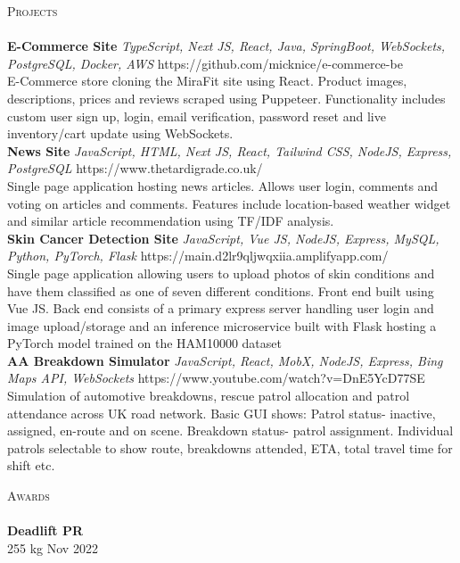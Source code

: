 \documentclass[a4paper]{article}
\newcommand{\lineunder} {
    \vspace*{-8pt} \\
    \hspace*{-18pt} \hrulefill \\
}
\newcommand{\header} [1] {
    {\hspace*{-18pt}\vspace*{6pt} \textsc{#1}}
    \vspace*{-6pt} \lineunder
}
\begin{document}
\header{Projects}
{\textbf{E-Commerce Site}} {\sl TypeScript, Next JS, React, Java, SpringBoot, WebSockets, PostgreSQL, Docker, AWS} \hfill https://github.com/micknice/e-commerce-be\\
E-Commerce store cloning the MiraFit site using React. Product images, descriptions, prices and reviews scraped using Puppeteer. Functionality includes custom user sign up, login, email verification, password reset and live inventory/cart update using WebSockets.\\
\vspace*{2mm}
{\textbf{News Site}} {\sl JavaScript, HTML, Next JS, React, Tailwind CSS, NodeJS, Express, PostgreSQL} \hfill https://www.thetardigrade.co.uk/\\
Single page application hosting news articles. Allows user login, comments and voting on articles and comments. Features include location-based weather widget and similar article recommendation using TF/IDF analysis.\\
\vspace*{2mm}
{\textbf{Skin Cancer Detection Site}} {\sl JavaScript, Vue JS, NodeJS, Express, MySQL, Python, PyTorch, Flask} \hfill https://main.d2lr9qljwqxiia.amplifyapp.com/\\
Single page application allowing users to upload photos of skin conditions and have them classified as one of seven different conditions. Front end built using Vue JS. Back end consists of a primary express server handling user login and image upload/storage and an inference microservice built with Flask hosting a PyTorch model trained on the HAM10000 dataset\\
\vspace*{2mm}
{\textbf{AA Breakdown Simulator}} {\sl JavaScript, React, MobX, NodeJS, Express, Bing Maps API, WebSockets} \hfill https://www.youtube.com/watch?v=DnE5YcD77SE\\
Simulation of automotive breakdowns, rescue patrol allocation and patrol attendance across UK road network. Basic GUI shows: Patrol status- inactive, assigned, en-route and on scene. Breakdown status- patrol assignment. Individual patrols selectable to show route, breakdowns attended, ETA, total travel time for shift etc.\\
\vspace*{2mm}

\header{Awards}
\textbf{Deadlift PR}\\
255 kg \hfill Nov 2022\\
\vspace*{2mm}
\end{document}
